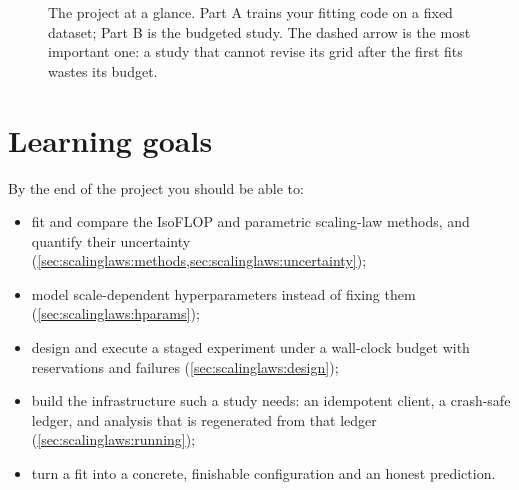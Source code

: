 \begin{figure}[t]
\centering
{}
\caption{The project at a glance. Part A trains your fitting code on a fixed dataset; Part B is the
budgeted study. The dashed arrow is the most important one: a study that cannot revise its grid
after the first fits wastes its budget.}
\label{fig:proj3:overview}
\end{figure}

\section{Learning goals}\label{sec:proj3:goals}
By the end of the project you should be able to:
\begin{itemize}
\item fit and compare the IsoFLOP and parametric scaling-law methods, and quantify their
      uncertainty (\cref{sec:scalinglaws:methods,sec:scalinglaws:uncertainty});
\item model scale-dependent hyperparameters instead of fixing them (\cref{sec:scalinglaws:hparams});
\item design and execute a staged experiment under a wall-clock budget with reservations and
      failures (\cref{sec:scalinglaws:design});
\item build the infrastructure such a study needs: an idempotent client, a crash-safe ledger, and
      analysis that is regenerated from that ledger (\cref{sec:scalinglaws:running});
\item turn a fit into a concrete, finishable configuration and an honest prediction.
\end{itemize}

